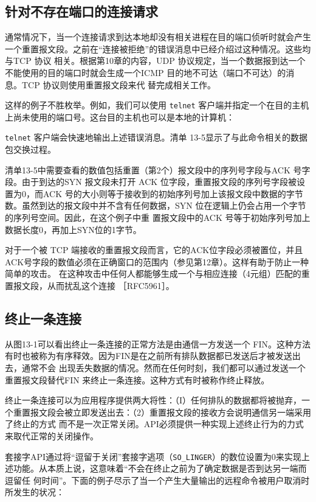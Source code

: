 \subsection{针对不存在端口的连接请求}
通常情况下，当一个连接请求到达本地却没有相关进程在目的端口侦听时就会产生一个重置报文段。之前在“连接被拒绝”的错误消息中已经介绍过这种情况。这些均与TCP 协议
相关。根据第10章的内容，UDP 协议规定，当一个数据报到达一个不能使用的目的端口时就会生成一个ICMP 目的地不可达（端口不可达）的消息。TCP 协议则使用重置报文段来代
替完成相关工作。

这样的例子不胜枚举。例如，我们可以使用 \verb|telnet| 客户端并指定一个在目的主机上尚未使用的端口号。这台目的主机也可以是本地的计算机：

\verb|telnet| 客户端会快速地输出上述错误消息。清单 13-5显示了与此命令相关的数据包交换过程。

清单13-5中需要查看的数值包括重置（第2个）报文段中的序列号字段与ACK 号字段。由于到达的SYN 报文段未打开 ACK 位字段，重置报文段的序列号字段被设置为0，而ACK
号的大小则等于接收到的初始序列号加上该报文段中数据的字节数。虽然到达的报文段中并不含有任何数据，SYN 位在逻辑上仍会占用一个字节的序列号空间。因此，在这个例子中重
置报文段中的ACK 号等于初始序列号加上数据长度0，再加上SYN位的1字节。

对于一个被 TCP 端接收的重置报文段而言，它的ACK位字段必须被置位，并且 ACK号字段的数值必须在正确窗口的范围内（参见第12章）。这样有助于防止一种简单的攻击。
在这种攻击中任何人都能够生成一个与相应连接（4元组）匹配的重置报文段，从而扰乱这个连接 ［RFC5961］。
\subsection{终止一条连接}
从图13-1可以看出终止一条连接的正常方法是由通信一方发送一个 FIN。这种方法有时也被称为有序释效。因为FIN是在之前所有排队数据都已发送后才被发送出去，通常不会
出现丢失数据的情况。然而在任何时刻，我们都可以通过发送一个重置报文段替代FIN 来终止一条连接。这种方式有时被称作终止释放。

终止一条连接可以为应用程序提供两大将性：（I）任何排队的数据都将被抛弃，一个重置报文段会被立即发送出去：（2）重置报文段的接收方会说明通信另一端采用了终止的方式
而不是一次正常关闭。API必须提供一种实现上述终止行为的力式来取代正常的关闭操作。

套接字API通过将“逗留于关闭”套接字逃项（\verb|SO_LINGER|）的数位设置为0来实现上述功能。从本质上说，这意味着“不会在终止之前为了确定数据是否到达另一端而逗留任
何时间”。下面的例子尽示了当一个产生大量输出的远程命令被用户取消时所发生的状况：

